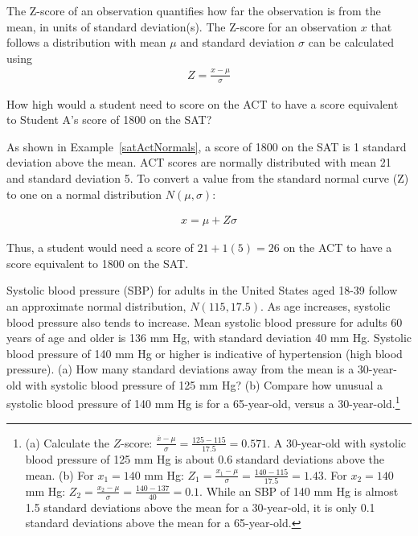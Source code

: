 \begin{termBox}{
The Z-score of an observation quantifies how far the observation is from the mean, in units of standard deviation(s). The Z-score for an observation $x$ that follows a distribution with mean $\mu$ and standard deviation $\sigma$ can be calculated using
\begin{align*}
Z = \frac{x-\mu}{\sigma}
\end{align*}}
\end{termBox}

\begin{example}
{How high would a student need to score on the ACT to have a score equivalent to Student A's score of 1800 on the SAT?} 

As shown in Example~\ref{satActNormals}, a score of 1800 on the SAT is 1 standard deviation above the mean. ACT scores are normally distributed with mean 21 and standard deviation 5. To convert a value from the standard normal curve (Z) to one on a normal distribution $N(\mu, \sigma)$:

\begin{align*}
x = \mu + Z\sigma
\end{align*}

Thus, a student would need a score of $21 + 1(5) = 26$ on the ACT to have a score equivalent to 1800 on the SAT. 
\end{example}

\begin{exercise} \label{nhanes_bp}
Systolic blood pressure (SBP) for adults in the United States aged 18-39 follow an approximate normal distribution, $N(115, 17.5)$. As age increases, systolic blood pressure also tends to increase. Mean systolic blood pressure for adults 60 years of age and older is 136 mm Hg, with standard deviation 40 mm Hg. Systolic blood pressure of 140 mm Hg or higher is indicative of hypertension (high blood pressure). 
(a) How many standard deviations away from the mean is a 30-year-old with systolic blood pressure of 125 mm Hg? (b) Compare how unusual a systolic blood pressure of 140 mm Hg is for a 65-year-old, versus a 30-year-old.\footnote{(a) Calculate the $Z$-score: $\frac{\overline{x} - \mu}{\sigma} = \frac{125 - 115}{17.5} = 0.571$. A 30-year-old with systolic blood pressure of 125 mm Hg is about 0.6 standard deviations above the mean. (b) For $x_1=140$ mm Hg: $Z_1 = \frac{x_1 - \mu}{\sigma} = \frac{140 - 115}{17.5} = 1.43$. For $x_2=140$ mm Hg: $Z_2 = \frac{x_2 - \mu}{\sigma} = \frac{140 - 137}{40} = 0.1$. While an SBP of 140 mm Hg is almost 1.5 standard deviations above the mean for a 30-year-old, it is only 0.1 standard deviations above the mean for a 65-year-old.}
\end{exercise} 

